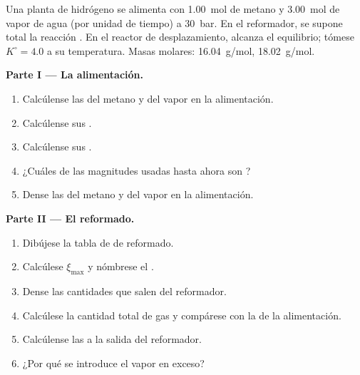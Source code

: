 \begin{problem}
\label{pb:b1:extent-q-and-k:1}
Una planta de hidrógeno se alimenta con \qty{1.00}{mol} de metano y
\qty{3.00}{mol} de vapor de agua (por unidad de tiempo) a \qty{30}{bar}.
En el reformador, se supone total la reacción .
En el reactor de desplazamiento,  alcanza el
equilibrio; tómese $K^\circ =
4.0$ a su temperatura. Masas molares:  \qty{16.04}{g/mol},
 \qty{18.02}{g/mol}.

\medskip
\noindent\textbf{Parte I --- La alimentación.}
\begin{enumerate}
  \item Calcúlense las  del metano y del vapor en la
        alimentación.
  \item Calcúlense sus .
  \item Calcúlense sus .
  \item ¿Cuáles de las magnitudes usadas hasta ahora son ?
  \item Dense las  del metano y del vapor en la alimentación.
\end{enumerate}

\medskip
\noindent\textbf{Parte II --- El reformado.}
\begin{enumerate}[resume]
  \item Dibújese la tabla de  de reformado.
  \item Calcúlese $\xi_{\max}$ y nómbrese el .
  \item Dense las cantidades que salen del reformador.
  \item Calcúlese la cantidad total de gas y compárese con la de la
        alimentación.
  \item Calcúlense las  a la salida del reformador.
  \item ¿Por qué se introduce el vapor en exceso?
\end{enumerate}


\end{problem}
